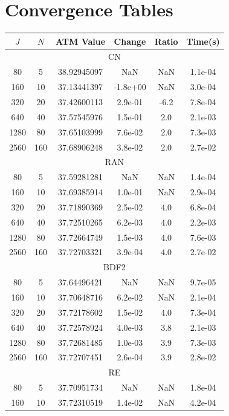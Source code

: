 \documentclass[]{rAMF2e}
\begin{document}
\section{Convergence Tables}
\begin{table}[htb]
\begin{small}
\begin{tabular}{|c|c|c|c|c|c|}
\hline
 $J$ & $N$ & ATM Value & Change & Ratio & Time(s)\\
\hline \multicolumn{6}{|c|}{CN} \\ \hline
 80 & 5 & 38.92945097 & NaN & NaN & 1.1e-04\\
 160 & 10 & 37.13441397 & -1.8e+00 & NaN & 3.0e-04\\
 320 & 20 & 37.42600113 & 2.9e-01 & -6.2 & 7.8e-04\\
 640 & 40 & 37.57545976 & 1.5e-01 & 2.0 & 2.1e-03\\
 1280 & 80 & 37.65103999 & 7.6e-02 & 2.0 & 7.3e-03\\
 2560 & 160 & 37.68906248 & 3.8e-02 & 2.0 & 2.7e-02\\
\hline \multicolumn{6}{|c|}{RAN} \\ \hline
 80 & 5 & 37.59281281 & NaN & NaN & 1.4e-04\\
 160 & 10 & 37.69385914 & 1.0e-01 & NaN & 2.9e-04\\
 320 & 20 & 37.71890369 & 2.5e-02 & 4.0 & 6.8e-04\\
 640 & 40 & 37.72510265 & 6.2e-03 & 4.0 & 2.2e-03\\
 1280 & 80 & 37.72664749 & 1.5e-03 & 4.0 & 7.6e-03\\
 2560 & 160 & 37.72703321 & 3.9e-04 & 4.0 & 2.7e-02\\
\hline \multicolumn{6}{|c|}{BDF2} \\ \hline
 80 & 5 & 37.64496421 & NaN & NaN & 9.7e-05\\
 160 & 10 & 37.70648716 & 6.2e-02 & NaN & 2.1e-04\\
 320 & 20 & 37.72178602 & 1.5e-02 & 4.0 & 7.3e-04\\
 640 & 40 & 37.72578924 & 4.0e-03 & 3.8 & 2.1e-03\\
 1280 & 80 & 37.72681485 & 1.0e-03 & 3.9 & 7.3e-03\\
 2560 & 160 & 37.72707451 & 2.6e-04 & 3.9 & 2.8e-02\\
\hline \multicolumn{6}{|c|}{RE} \\ \hline
 80 & 5 & 37.70951734 & NaN & NaN & 1.8e-04\\
 160 & 10 & 37.72310519 & 1.4e-02 & NaN & 4.2e-04\\

\end{tabular}
\end{small}
\end{table}
\end{document}
